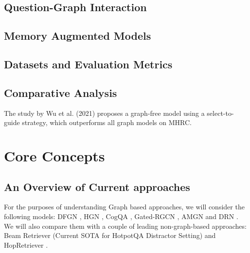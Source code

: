 \documentclass[sigplan,screen]{acmart}
\begin{document}
\subsection{Question-Graph Interaction}

\subsection{Memory Augmented Models}

\subsection{Datasets and Evaluation Metrics}

\subsection{Comparative Analysis}
The study by Wu et al. (2021) \cite{RN106} proposes a graph-free model using a select-to-guide strategy, which outperforms all graph models on MHRC.

\section{Core Concepts}
\subsection{An Overview of Current approaches}
For the purposes of understanding Graph based approaches, we will consider the following models:
DFGN \cite{RN122}, HGN \cite{RN119}, CogQA \cite{RN118}, Gated-RGCN \cite{RN91}, AMGN \cite{RN131} and DRN \cite{RN142}. We will also compare 
them with a couple of leading non-graph-based approaches: Beam Retriever \cite{RN105} (Current SOTA for HotpotQA Distractor Setting) and
HopRetriever \cite{RN149}.
\end{document}
